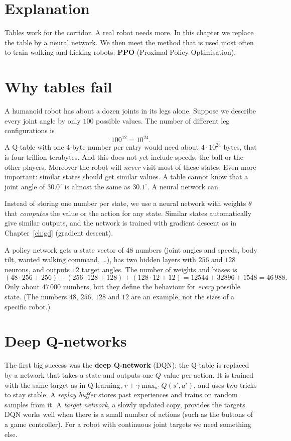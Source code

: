 \label{ch:rl4}

\section*{Explanation}
Tables work for the corridor. A real robot needs more. In this chapter we replace the table by a neural network. We then meet the method that is used most often to train walking and kicking robots: \textbf{PPO} (Proximal Policy Optimisation).

\section*{Why tables fail}
A humanoid robot has about a dozen joints in its legs alone. Suppose we describe every joint angle by only $100$ possible values. The number of different leg configurations is
\[
100^{12}=10^{24}.
\]
A Q-table with one 4-byte number per entry would need about $4\cdot10^{24}$ bytes, that is four trillion terabytes. And this does not yet include speeds, the ball or the other players. Moreover the robot will \emph{never} visit most of these states. Even more important: similar states should get similar values. A table cannot know that a joint angle of $30.0^\circ$ is almost the same as $30.1^\circ$. A neural network can.

\begin{keyidea}
Instead of storing one number per state, we use a neural network with weights $\theta$ that \emph{computes} the value or the action for any state. Similar states automatically give similar outputs, and the network is trained with gradient descent as in Chapter~\ref{ch:gd} (gradient descent).
\end{keyidea}

\begin{example}
A policy network gets a state vector of $48$ numbers (joint angles and speeds, body tilt, wanted walking command, \dots), has two hidden layers with $256$ and $128$ neurons, and outputs $12$ target angles. The number of weights and biases is
\[
(48\cdot256+256)+(256\cdot128+128)+(128\cdot12+12)=12544+32896+1548=46\,988 .
\]
Only about $47\,000$ numbers, but they define the behaviour for \emph{every} possible state. (The numbers $48$, $256$, $128$ and $12$ are an example, not the sizes of a specific robot.)
\end{example}

\section*{Deep Q-networks}
The first big success was the \textbf{deep Q-network} (DQN): the Q-table is replaced by a network that takes a state and outputs one $Q$ value per action. It is trained with the same target as in Q-learning, $r+\gamma\max_{a'}Q(s',a')$, and uses two tricks to stay stable. A \emph{replay buffer} stores past experiences and trains on random samples from it. A \emph{target network}, a slowly updated copy, provides the targets. DQN works well when there is a small number of actions (such as the buttons of a game controller). For a robot with continuous joint targets we need something else.

